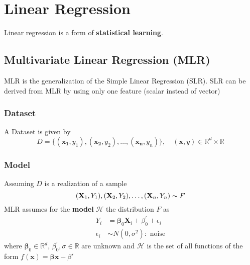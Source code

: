 
\section{Linear Regression}
Linear regression is a form of \textbf{statistical learning}.

\subsection{Multivariate Linear Regression (MLR)}
MLR is the generalization of the Simple Linear Regression (SLR). SLR can be derived from MLR by using only one feature (scalar instead of vector)
\subsubsection{Dataset}

A Dataset is given by
\begin{equation*}
    D=\{(\mathbf{x_1},y_1),(\mathbf{x_2},y_2),\dots,(\mathbf{x_n},y_n)\}, \quad (\mathbf{x},y) \in\mathbb{R}^d\times\mathbb{R}
\end{equation*}

\subsubsection{Model}
Assuming $D$ is a realization of a sample
\begin{equation*}
    (\mathbf{X}_1,Y_1),(\mathbf{X}_2,Y_2),\dots,(\mathbf{X}_n,Y_n)\thicksim F
\end{equation*}
MLR assumes for the \textbf{model} $\mathcal{H}$ the distribution $F$ as
\begin{align*}
    Y_i        & =\boldsymbol{\beta}_0\mathbf{X}_i+\beta^{\prime}_0+\epsilon_i \\
    \epsilon_i & \sim N(0,\sigma^2): \text{ noise}
\end{align*}
where $\boldsymbol{\beta}_0\in \mathbb{R}^d$, $\beta^{\prime}_0,\sigma \in \mathbb{R}$ are unknown and $\mathcal{H}$ is the set of all functions of the form $f(\mathbf{x}) = \boldsymbol{\beta}\mathbf{x} +\beta'$

